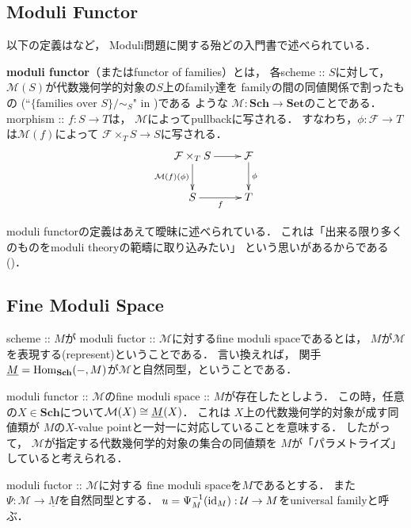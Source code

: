 \documentclass[a4paper]{jsarticle}
\newcommand{\Sch}{\mathbf{Sch}}
\newcommand{\Set}{\mathbf{Set}}
\newcommand{\famF}{\mathcal{F}}
\newcommand{\famU}{\mathcal{U}}
\newcommand{\func}[1]{\underline{#1}}
\newcommand{\ftorM}{\mathcal{M}}
\begin{document}
    \subsection{Moduli Functor}
    以下の定義は\cite{HaMo}など，
    Moduli問題に関する殆どの入門書で述べられている．
    \begin{Def}
        \textbf{moduli functor}（またはfunctor of families）とは，
        各scheme :: $S$に対して，
        $\ftorM(S)$が代数幾何学的対象の$S$上のfamily達を
        familyの間の同値関係で割ったもの
        (``$\{ \text{families over }S \}/\sim_S$" in \cite{Hos})である
        ような $\ftorM : \Sch \to \Set$のことである．
        morphism :: $f : S \to T$は，
        $\ftorM$によってpullbackに写される．
        すなわち，$\phi: \famF \to T$は$\ftorM(f)$によって
        $\famF \times_T S \to S$に写される．
        \[\xymatrix{
                \famF \times_T S \ar[d]_-{\ftorM(f)(\phi)}\ar[r]& \famF \ar[d]^-{\phi}\\
            S \ar[r]_-{f}& T
        }\]
    \end{Def}
    moduli functorの定義はあえて曖昧に述べられている．
    これは「出来る限り多くのものをmoduli theoryの範疇に取り込みたい」
    という思いがあるからである(\cite{HaMo})．

    \subsection{Fine Moduli Space}
    \begin{Def}
        scheme :: $M$が
        moduli fuctor :: $\ftorM$に対するfine moduli spaceであるとは，
        $M$が$\ftorM$を表現する(represent)ということである．
        言い換えれば，
        関手$\func{M}=\Hom_{\Sch}(-, M)$が$\ftorM$と自然同型，ということである．
    \end{Def}

    \begin{Remark}
        moduli functor :: $\ftorM$のfine moduli space :: $M$が存在したとしよう．
        この時，任意の$X \in \Sch$について$\ftorM(X) \iso \func{M}(X)$．
        これは
        $X$上の代数幾何学的対象が成す同値類が
        $M$の$X$-value pointと一対一に対応していることを意味する．
        したがって，
        $\ftorM$が指定する代数幾何学的対象の集合の同値類を
        $M$が「パラメトライズ」していると考えられる．
    \end{Remark}

    \begin{Def}
        moduli fuctor :: $\ftorM$に対する
        fine moduli spaceを$M$であるとする．
        また$\Psi: \ftorM \to \func{M}$を自然同型とする．
        $u=\Psi_M^{-1}(\id[M]): \famU \to M$をuniversal familyと呼ぶ．
    \end{Def}
\end{document}
